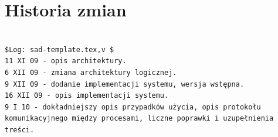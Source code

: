 \documentclass[12pt,a4paper,twoside]{article}
\begin{document}




\section{Historia zmian}

\begin{verbatim}

$Log: sad-template.tex,v $
11 XI 09 - opis architektury.
6 XII 09 - zmiana architektury logicznej.
9 XII 09 - dodanie implementacji systemu, wersja wstępna.
16 XII 09 - opis implementacji systemu.
9 I 10 - dokładniejszy opis przypadków użycia, opis protokołu komunikacyjnego między procesami, liczne poprawki i uzupełnienia treści.

\end{verbatim}
\end{document}

